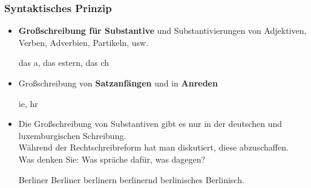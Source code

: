 \begin{frame}
\frametitle{Syntaktisches Prinzip}

\begin{itemize}
	\item \textbf{Großschreibung für Substantive} und Substantivierungen von Adjektiven, Verben, Adverbien, Partikeln, usw. 

	\ea das a, das estern, das ch
	\z 
	
	\item Großschreibung von \textbf{Satzanfängen} und in \textbf{Anreden}
	
	\ea {}ie, hr
	\z 

	
	\item Die Großschreibung von Substantiven gibt es nur in der deutschen und luxemburgischen Schreibung.\\
	Während der Rechtschreibreform hat man diskutiert, diese abzuschaffen.\\
	Was denken Sie: Was spräche dafür, was dagegen?

\pause 
	
	\ea Berliner Berliner berlinern berlinernd berlinisches Berlinisch.
	\z 
\end{itemize}

\end{frame}






